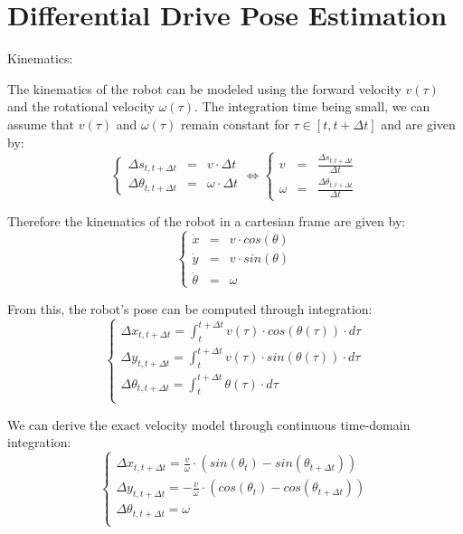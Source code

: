 \documentclass[a4paper]{article}
\begin{document}
\section{Differential Drive Pose Estimation}

Kinematics:

The kinematics of the robot can be modeled using the forward velocity $v(\tau)$ and the rotational velocity $\omega(\tau)$.
The integration time being small, we can assume that $v(\tau)$ and $\omega(\tau)$ remain constant for $\tau \in [t, t+\Delta t]$ and are given by:
\begin{equation}
\left\{
\begin{array}{lcl}
    \Delta s_{t,t+\Delta t} &=& v \cdot \Delta t \\
    \Delta \theta_{t,t+\Delta t} &=& \omega \cdot \Delta t
\end{array}
\right.
\iff
\left\{
\begin{array}{lcl}
    v &=&  \frac{\Delta s_{t,t+\Delta t}}{\Delta t} \\
    \omega &=& \frac{\Delta \theta_{t,t+\Delta t}}{\Delta t}
\end{array}
\right.
\label{eqn:discrete_speeds}
\end{equation}

Therefore the kinematics of the robot in a cartesian frame are given by:
\begin{equation}
\left\{
\begin{array}{lcl}
    \dot x &=& v \cdot cos(\theta) \\
    \dot y &=& v \cdot sin(\theta) \\
    \dot \theta &=& \omega
\end{array}
\right.
\end{equation}

From this, the robot's pose can be computed through integration:
\begin{equation}
\left\{
\begin{array}{lcl}
    \Delta x_{t,t+\Delta t} = \int_t^{t+\Delta t} v(\tau) \cdot cos(\theta(\tau)) \cdot d\tau \\
    \Delta y_{t,t+\Delta t} = \int_t^{t+\Delta t} v(\tau) \cdot sin(\theta(\tau)) \cdot d\tau \\
    \Delta \theta_{t,t+\Delta t} = \int_t^{t+\Delta t} \theta(\tau) \cdot d\tau \\
\end{array}
\right.
\end{equation}

We can derive the exact velocity model through continuous time-domain integration:
\begin{equation}
\left\{
\begin{array}{lcl}
    \Delta x_{t,t+\Delta t} = \frac{v}{\omega} \cdot (sin(\theta_{t}) - sin(\theta_{t+\Delta t})) \\
    \Delta y_{t,t+\Delta t} = - \frac{v}{\omega} \cdot (cos(\theta_{t}) - cos(\theta_{t+\Delta t})) \\
    \Delta \theta_{t,t+\Delta t} = \omega \\
\end{array}
\right.
\end{equation}
\end{document}
